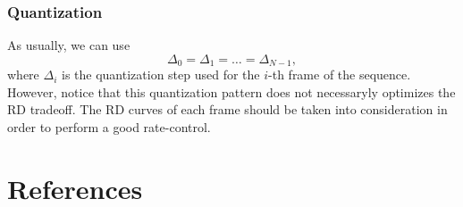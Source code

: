 \subsubsection{Quantization}
As usually, we can use
\begin{equation}
  \Delta_0=\Delta_1=\dots=\Delta_{N-1},
\end{equation}
where $\Delta_i$ is the quantization step used for the $i$-th frame of
the sequence. However, notice that this quantization pattern does not
necessaryly optimizes the RD tradeoff. The RD curves of each frame
should be taken into consideration in order to perform a good
rate-control.

\section{References}

\renewcommand{\addcontentsline}[3]{}%


